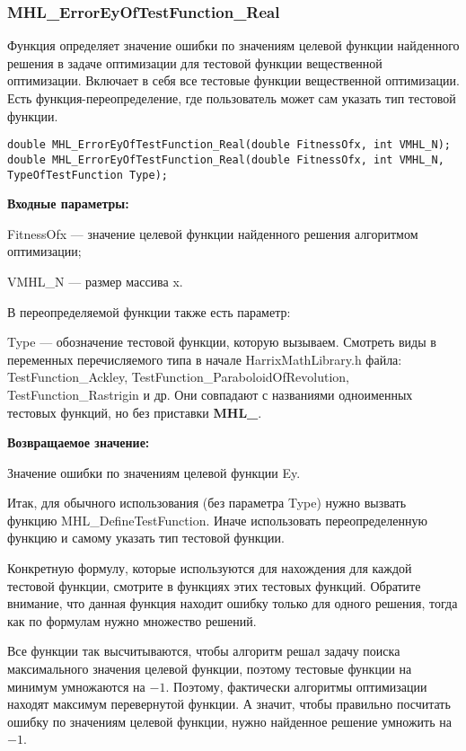 \documentclass[a4paper,12pt]{article}
\begin{document}
\subsubsection{MHL\_ErrorEyOfTestFunction\_Real}\label{MHL_ErrorEyOfTestFunction_Real}

Функция определяет значение ошибки по значениям целевой функции найденного решения в задаче оптимизации для тестовой функции вещественной оптимизации. Включает в себя все тестовые функции вещественной оптимизации. Есть функция-переопределение, где пользователь может сам указать тип тестовой функции.


\begin{lstlisting}[label=code_syntax_MHL_ErrorEyOfTestFunction_Real,caption=Синтаксис]
double MHL_ErrorEyOfTestFunction_Real(double FitnessOfx, int VMHL_N);
double MHL_ErrorEyOfTestFunction_Real(double FitnessOfx, int VMHL_N, TypeOfTestFunction Type);
\end{lstlisting}

\textbf{Входные параметры:}

FitnessOfx --- значение целевой функции найденного решения алгоритмом оптимизации;

VMHL\_N --- размер массива x.

В переопределяемой функции также есть параметр:
  
Type --- обозначение тестовой функции, которую вызываем.
Смотреть виды в переменных перечисляемого типа в начале HarrixMathLibrary.h файла: TestFunction\_Ackley, TestFunction\_ParaboloidOfRevolution, TestFunction\_Rastrigin и др. Они совпадают с названиями одноименных тестовых функций, но без приставки \textbf{MHL\_}.

\textbf{Возвращаемое значение:}
 
Значение ошибки по значениям целевой функции Ey.

Итак, для обычного использования (без параметра Type) нужно вызвать функцию MHL\_DefineTestFunction. Иначе использовать переопределенную функцию и самому указать тип тестовой функции.

Конкретную формулу, которые используются для нахождения для каждой тестовой функции, смотрите в функциях этих тестовых функций. Обратите внимание, что данная функция находит ошибку только для одного решения, тогда как по формулам нужно множество решений.

Все функции так высчитываются, чтобы алгоритм решал задачу поиска максимального значения целевой функции, поэтому тестовые функции на минимум умножаются на $-1$. Поэтому, фактически алгоритмы оптимизации находят максимум перевернутой функции. А значит, чтобы правильно посчитать ошибку по значениям целевой функции, нужно найденное решение умножить на $-1$.
\end{document}

